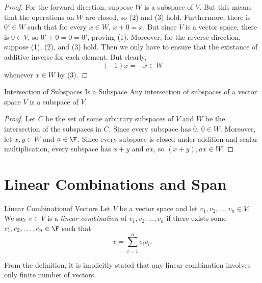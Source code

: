 \documentclass[linearalgebraI]{subfiles}
\begin{document}
    \begin{proof}
        For the forward direction, suppose $W$ is a subspace of $V$. But this means that the operations on $W$ are closed, so (2) and (3) hold. Furthermore, there is $0'\in W$ such that for every $x\in W$, $x+0 = x$. But since $V$ is a vector space, there is $0\in V$, so $0'+0 = 0 = 0'$, proving (1). Moreover, for the reverse direction, suppose (1), (2), and (3) hold. Then we only have to ensure that the existance of additive inverse for each element. But clearly,
        \begin{equation*}
            (-1)x = -x\in W
        \end{equation*}
        whenever $x\in W$ by (3).
    \end{proof}

    \begin{prop}{Intersection of Subspaces Is a Subspace}
        Any intersection of subspaces of a vector space $V$ is a subspace of $V$.
    \end{prop}

    \begin{proof}
        Let $C$ be the set of some arbitrary subspaces of $V$ and $W$ be the intersection of the subspaces in $C$. Since every subspace has $0$, $0\in W$. Moreover, let $x, y\in W$ and $a\in \F$. Since every subspace is closed under addition and scalar multiplication, every subspace has $x+y$ and $ax$, so $(x+y), ax\in W$.
    \end{proof}

    \section{Linear Combinations and Span}

    \begin{definition}{Linear Combination}{of Vectors}
        Let $V$ be a vector space and let $v_1,v_2,\ldots,v_n\in V$. We say $v\in V$ is a \emph{linear combination} of $v_1,v_2,\ldots,v_n$ if there exists some $c_1,c_2,\ldots,c_n\in\F$ such that
        \begin{equation*}
            v = \sum^{n}_{i=1} c_iv_i.
        \end{equation*}
    \end{definition}

    \begin{remark}
        From the definition, it is implicitly stated that any linear combination involves only finite number of vectors.
    \end{remark}
\end{document}
